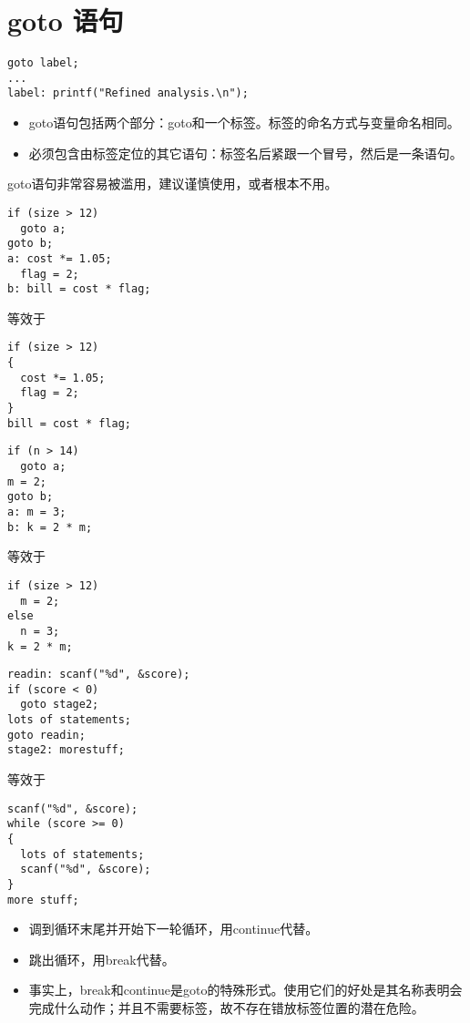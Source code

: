 \section{goto 语句}

\begin{frame}[fragile]\ft{\secname}
\begin{lstlisting}[title=goto语法]
goto label;
...
label: printf("Refined analysis.\n");
\end{lstlisting}

\begin{itemize}
\item
goto语句包括两个部分：goto和一个标签。标签的命名方式与变量命名相同。\\[0.1in]
\item 
必须包含由标签定位的其它语句：标签名后紧跟一个冒号，然后是一条语句。
\end{itemize}
\end{frame}

\begin{frame}[fragile]\ft{\secname}
goto语句非常容易被滥用，建议谨慎使用，或者根本不用。
\end{frame}

\begin{frame}[fragile]\ft{\secname}
\begin{lstlisting}
if (size > 12)
  goto a;
goto b;
a: cost *= 1.05;
  flag = 2;
b: bill = cost * flag;    
\end{lstlisting}
等效于
\begin{lstlisting}
if (size > 12)
{
  cost *= 1.05;
  flag = 2;
}  
bill = cost * flag;    
\end{lstlisting}
\end{frame}

\begin{frame}[fragile]\ft{\secname}
\begin{lstlisting}
if (n > 14)
  goto a;
m = 2;  
goto b;
a: m = 3;
b: k = 2 * m;    
\end{lstlisting}
等效于
\begin{lstlisting}
if (size > 12)
  m = 2;
else
  n = 3;   
k = 2 * m;    
\end{lstlisting}
\end{frame}


\begin{frame}[fragile]\ft{\secname}
\begin{lstlisting}
readin: scanf("%d", &score);
if (score < 0)
  goto stage2;
lots of statements;
goto readin;
stage2: morestuff;      
\end{lstlisting}
等效于
\begin{lstlisting}
scanf("%d", &score); 
while (score >= 0)
{
  lots of statements;
  scanf("%d", &score);
}   
more stuff;
\end{lstlisting}
\end{frame}


\begin{frame}[fragile]\ft{\secname}
\begin{itemize}
\item 调到循环末尾并开始下一轮循环，用continue代替。\\[0.1in]
\item 跳出循环，用break代替。\\[0.1in]
\item 事实上，break和continue是goto的特殊形式。使用它们的好处是其名称表明会完成什么动作；并且不需要标签，故不存在错放标签位置的潜在危险。
\end{itemize}
\end{frame}
